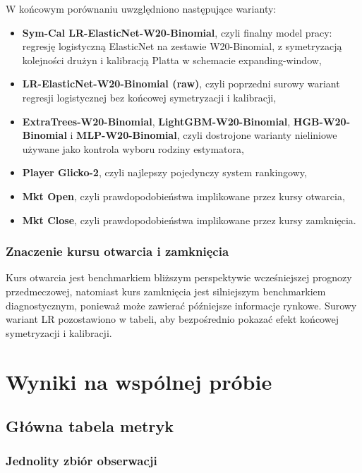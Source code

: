 W końcowym porównaniu uwzględniono następujące warianty:

\begin{itemize}
    \item \textbf{Sym-Cal LR-ElasticNet-W20-Binomial}, czyli finalny model pracy: regresję logistyczną ElasticNet na zestawie W20-Binomial, z symetryzacją kolejności drużyn i kalibracją Platta w schemacie expanding-window,
    \item \textbf{LR-ElasticNet-W20-Binomial (raw)}, czyli poprzedni surowy wariant regresji logistycznej bez końcowej symetryzacji i kalibracji,
    \item \textbf{ExtraTrees-W20-Binomial}, \textbf{LightGBM-W20-Binomial}, \textbf{HGB-W20-Binomial} i \textbf{MLP-W20-Binomial}, czyli dostrojone warianty nieliniowe używane jako kontrola wyboru rodziny estymatora,
    \item \textbf{Player Glicko-2}, czyli najlepszy pojedynczy system rankingowy,
    \item \textbf{Mkt Open}, czyli prawdopodobieństwa implikowane przez kursy otwarcia,
    \item \textbf{Mkt Close}, czyli prawdopodobieństwa implikowane przez kursy zamknięcia.
\end{itemize}

\subsubsection{Znaczenie kursu otwarcia i zamknięcia}

Kurs otwarcia jest benchmarkiem bliższym perspektywie wcześniejszej prognozy przedmeczowej, natomiast kurs zamknięcia jest silniejszym benchmarkiem diagnostycznym, ponieważ może zawierać późniejsze informacje rynkowe. Surowy wariant LR pozostawiono w tabeli, aby bezpośrednio pokazać efekt końcowej symetryzacji i kalibracji.

\section{Wyniki na wspólnej próbie}

\subsection{Główna tabela metryk}

\subsubsection{Jednolity zbiór obserwacji}

